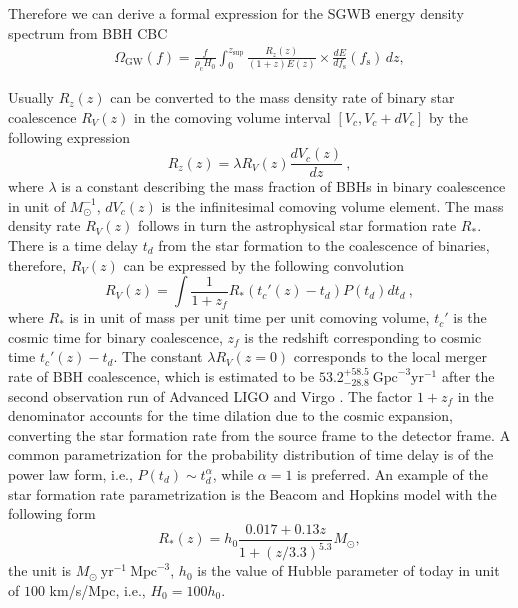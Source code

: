 Therefore we can derive a formal expression for the \ac{SGWB} energy density spectrum from \ac{BBH} \ac{CBC}
\begin{align}
\Omega_{\textrm{GW}}(f) = \frac{f}{\rho_\textrm{c}H_0} \int_{0}^{z_{\textrm{sup}}} \frac{R_z(z)}{(1+z)E(z)} \times   \frac{dE}{df_\textrm{s}}(f_\textrm{s}) \, dz,
\end{align}

Usually $R_z(z)$ can be converted to the mass density rate of binary star coalescence $R_V(z)$ in the comoving volume interval $[V_c,V_c+dV_c]$ by the following expression \cite{SGWB-sfr-relation-1,Wu:2011ac}
\begin{equation}\label{eq:rzsfr}
R_z(z)=\lambda R_V(z)\frac {dV_c(z)}{dz}~,
\end{equation}
where  $\lambda$ is a constant describing the mass fraction of \acp{BBH} in binary coalescence in unit of $M_\odot^{-1}$, $dV_c(z)$ is the infinitesimal comoving volume element. 
The mass density rate $R_V(z)$ follows in turn the astrophysical star formation rate $R_\ast$.
There is a time delay $t_d$ from the star formation to the coalescence of binaries, therefore, $R_V(z)$ can be expressed by the following convolution
\begin{equation}\label{eq:sfr}
R_V(z)=\int \frac{1}{1+z_f} R_\ast(t_c'(z)-t_d)P(t_d)dt_d~,
\end{equation}
where $R_\ast$ is in unit of mass per unit time per unit comoving volume, $t_c'$ is the cosmic time for binary coalescence, $z_f$ is the redshift corresponding to cosmic time $t_c'(z)-t_d$.
The constant $\lambda R_V(z=0)$ corresponds to the local merger rate of \ac{BBH} coalescence, which is estimated to be $ 53.2_{-28.8}^{+58.5}~ \text{Gpc}^{-3} \text{yr}^{-1}$ after the second observation run of Advanced LIGO and Virgo \cite{GWTC1-rate}.
The factor $1+z_f$ in the denominator accounts for the time dilation due to the cosmic expansion, converting the star formation rate from the source frame to the detector frame.
A common parametrization for the probability distribution of time delay is of the power law form, i.e., $P(t_d)\sim t_d^\alpha$, while $\alpha=1$ is preferred.
An example of the star formation rate parametrization is the Beacom and Hopkins model \cite{sfr-Hopkins_2006} with the following form
\begin{equation}
R_*(z)=h_0\frac{0.017+0.13z}{1+(z/3.3)^{5.3}} M_\odot,
\end{equation}
the unit is $M_\odot ~\text{yr}^{-1}~ \text{Mpc}^{-3}$, $h_0$ is the value of Hubble parameter of today in unit of $100$ km/s/Mpc, i.e., $H_0 = 100h_0$.

